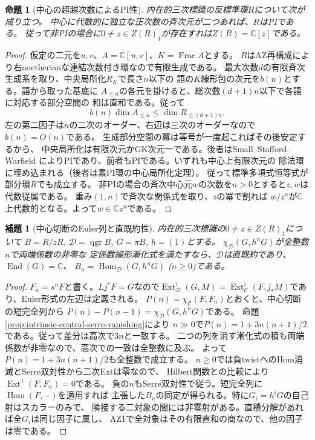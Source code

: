 \documentclass[11pt,a4paper]{ltjsarticle}
\newtheorem{proposition}[theorem]{命題}
\newtheorem{lemma}[theorem]{補題}
\theoremstyle{definition}
\newcommand{\qgr}{\operatorname{qgr}}
\begin{document}
\begin{proposition}[中心の超越次数によるPI性]
\label{prop:ou-pi-central-slice}
内在的三次標識の反標準環$R$について次が成り立つ。
中心に代数的に独立な正次数の斉次元が二つあれば、$R$はPIである。
従って非PIの場合に$0\ne z\in Z(R)_1$が存在すれば$Z(R)=\mathbb C[z]$である。
\end{proposition}
\begin{proof}
仮定の二元を$u,v$、$A=\mathbb C[u,v]$、$K=\operatorname{Frac}A$とする。
$R$はAZ再構成により右noetherianな連結次数付き環なので有限生成である。
最大次数$d$の有限斉次生成系を取り、中央局所化$R_K$で長さ$n$以下の
語の$K$線形包の次元を$b(n)$とする。語から取った基底に
$A_{\le n}$の各元を掛けると、総次数$(d+1)n$以下で各語に対応する部分空間の
和は直和である。従って
\[
 b(n)\dim A_{\le n}\le\dim R_{\le(d+1)n}.
\]
左の第二因子は$n$の二次のオーダー、右辺は三次のオーダーなので$b(n)=O(n)$である。
生成部分空間の冪は等号が一度起こればその後安定するから、
中央局所化は有限次元かGK次元一である。後者はSmall--Stafford--Warfield
\cite{SSW1985}によりPIであり、前者もPIである。いずれも中心上有限次元の
除法環に埋め込まれる（後者は素PI環の中心局所化定理）。
従って標準多項式恒等式が部分環$R$でも成立する。
非PIの場合の斉次中心元$w$の次数を$n>0$とすると$z,w$は代数従属である。
重み$(1,n)$で斉次な関係式を取り、$z$の冪で割れば
$w/z^n$が$\mathbb C$上代数的となる。よって$w\in\mathbb C z^n$である。

\end{proof}

\begin{lemma}[中心切断のEuler列と直既約性]
\label{lem:ou-central-euler-connectivity}
内在的三次標識の$0\ne z\in Z(R)_1$について
$B=R/zR$, $\mathcal D=\qgr B$, $G=\pi B$, $h=(1)$とする。
$\chi_{\mathcal D}(G,h^nG)$が全整数$n$で両端係数の非零な
定係数線形漸化式を満たすなら、$\mathcal D$は直既約であり、
$\operatorname{End}(G)=\mathbb C$、
$B_n=\operatorname{Hom}_{\mathcal D}(G,h^nG)$ ($n\ge0$)である。
\end{lemma}
\begin{proof}
$F_n=s^nF$と書く。$Lj^*F=G$なので$\operatorname{Ext}_{\mathcal D}^i(G,M)
=\operatorname{Ext}_{\mathcal C}^i(F,j_*M)$であり、Euler形式の左辺は定義される。
$P(n)=\chi_{\mathcal C}(F,F_n)$とおくと、中心切断の短完全列から
$P(n)-P(n-1)=\chi_{\mathcal D}(G,h^nG)$である。
命題\ref{prop:intrinsic-central-serre-vanishing}により
$n\gg0$で$P(n)=1+3n(n+1)/2$である。従って差分は高次で$3n$と一致する。
二つの列を消す漸化式の積も両端係数が非零なので、高次での一致は全整数に及ぶ。
よって$P(n)=1+3n(n+1)/2$も全整数で成立する。
$n\ge0$では負twistへのHom消滅とSerre双対性から二次Extは零なので、
Hilbert関数との比較により$\operatorname{Ext}^1(F,F_n)=0$である。
負の$n$もSerre双対性で従う。短完全列に$\operatorname{Hom}(F,-)$を適用すれば
主張した$B_n$の同定が得られる。特に$G_i=h^iG$の自己射はスカラーのみで、
隣接する二対象の間には非零射がある。直積分解があれば全$G_i$は同じ因子に属し、
AZ1で全対象はその有限直和の商なので、他の因子は零である。
\end{proof}
\end{document}
